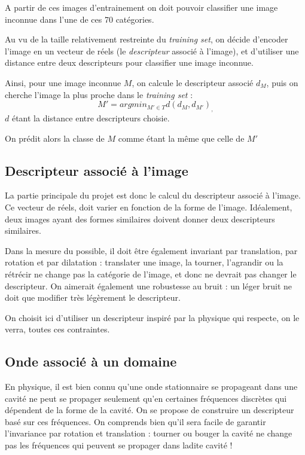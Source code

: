 \documentclass[a4paper,10pt]{article} %
\theoremstyle{definition} %
\begin{document}
A partir de ces images d'entrainement on doit pouvoir classifier une image inconnue dans l'une de ces 70 catégories.

Au vu de la taille relativement restreinte du \textit{training set}, on décide d'encoder l'image en un vecteur de réels (le \textit{descripteur} associé à l'image), et d'utiliser 
une distance entre deux descripteurs pour classifier une image inconnue.

Ainsi, pour une image inconnue $M$, on calcule le descripteur associé $d_M$, puis on cherche l'image la plus proche dans le \textit{training set} : $$M' = argmin_{M' \in T}{d(d_M, d_{M'})}_,   $$ $d$ étant la distance entre descripteurs choisie.

On prédit alors la classe de $M$ comme étant la même que celle de $M'$


\subsection{Descripteur associé à l'image}

La partie principale du projet est donc le calcul du descripteur associé à l'image. Ce vecteur de réels, doit varier en fonction de la forme de l'image.
Idéalement, deux images ayant des formes similaires doivent donner deux descripteurs similaires.

Dans la mesure du possible, il doit être également invariant par translation, par rotation et par dilatation : translater une image, la tourner, l'agrandir ou la rétrécir ne change pas la catégorie de l'image, et donc ne devrait pas changer le descripteur.
On aimerait également une robustesse au bruit : un léger bruit ne doit que modifier très légèrement le descripteur.

On choisit ici d'utiliser un descripteur inspiré par la physique qui respecte, on le verra, toutes ces contraintes.

\subsection*{Onde associé à un domaine}

En physique, il est bien connu qu'une onde stationnaire se propageant dans une cavité ne peut se propager seulement qu'en certaines fréquences discrètes qui dépendent de la forme de la cavité.
On se propose de construire un descripteur basé sur ces fréquences. On comprends bien qu'il sera facile de garantir l'invariance par rotation et translation : tourner ou bouger la cavité ne change pas les fréquences qui peuvent se propager dans ladite cavité !
\end{document}
